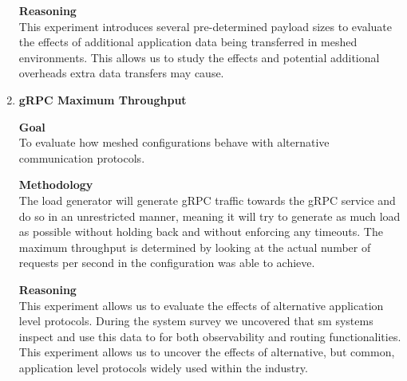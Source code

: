 \begin{enumerate}[label=\textbf{EXP\arabic*}, leftmargin=3\parindent]
    \textbf{Reasoning} \\
    This experiment introduces several pre-determined payload sizes to evaluate the effects of additional application data being transferred in meshed environments. This allows us to study the effects and potential additional overheads extra data transfers may cause. 
        
    \item \textbf{gRPC Maximum Throughput}
    \label{exp:design:4}
    
    \textbf{Goal} \\
    To evaluate how meshed configurations behave with alternative communication protocols.
        
    \textbf{Methodology} \\
    The load generator will generate gRPC traffic towards the gRPC service and do so in an unrestricted manner, meaning it will try to generate as much load as possible without holding back and without enforcing any timeouts. The maximum throughput is determined by looking at the actual number of requests per second in the configuration was able to achieve.
    
    \textbf{Reasoning} \\
    This experiment allows us to evaluate the effects of alternative application level protocols. During the system survey we uncovered that \gls{sm} systems inspect and use this data to for both observability and routing functionalities. This experiment allows us to uncover the effects of alternative, but common, application level protocols widely used within the industry.

\end{enumerate}

